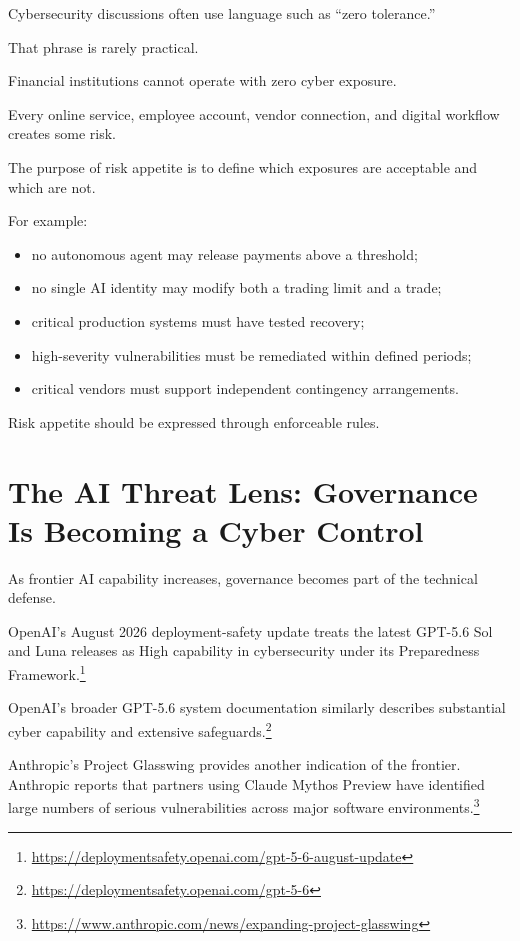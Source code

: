 Cybersecurity discussions often use language such as ``zero tolerance.''

That phrase is rarely practical.

Financial institutions cannot operate with zero cyber exposure.

Every online service, employee account, vendor connection, and digital workflow creates some risk.

The purpose of risk appetite is to define which exposures are acceptable and which are not.

For example:

\begin{itemize}
    \item no autonomous agent may release payments above a threshold;
    \item no single AI identity may modify both a trading limit and a trade;
    \item critical production systems must have tested recovery;
    \item high-severity vulnerabilities must be remediated within defined periods;
    \item critical vendors must support independent contingency arrangements.
\end{itemize}

Risk appetite should be expressed through enforceable rules.

\section{The AI Threat Lens: Governance Is Becoming a Cyber Control}

As frontier AI capability increases, governance becomes part of the technical defense.

OpenAI's August 2026 deployment-safety update treats the latest GPT-5.6 Sol and Luna releases as High capability in cybersecurity under its Preparedness Framework.\footnote{\url{https://deploymentsafety.openai.com/gpt-5-6-august-update}}

OpenAI's broader GPT-5.6 system documentation similarly describes substantial cyber capability and extensive safeguards.\footnote{\url{https://deploymentsafety.openai.com/gpt-5-6}}

Anthropic's Project Glasswing provides another indication of the frontier. Anthropic reports that partners using Claude Mythos Preview have identified large numbers of serious vulnerabilities across major software environments.\footnote{\url{https://www.anthropic.com/news/expanding-project-glasswing}}

